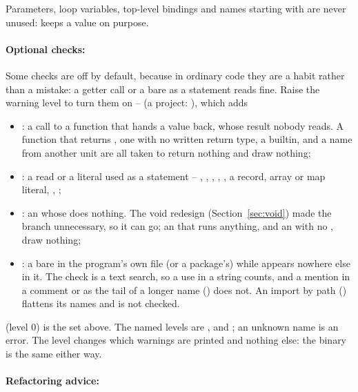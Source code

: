 \noindent Parameters, loop variables, top-level bindings and names
starting with \ic{\_} are never unused:  keeps a
value on purpose.

\paragraph{Optional checks: }
\label{sec:wlevel}

Some checks are off by default, because in ordinary code they are a
habit rather than a mistake: a getter call or a bare  as a
statement reads fine. Raise the warning level to turn them on --  (a project: ), which adds

\begin{itemize}[nosep]
\item {}: a call to a function that
  hands a value back, whose result nobody reads. A function that returns
  , one with no written return type, a builtin, and a name from
  another unit are all taken to return nothing and draw nothing;
\item {}: a read or a literal used
  as a statement -- , , , ,
  , a record, array or map literal, \ic{[x; n]}, ;
\item {}: an  whose  does
  nothing. The void redesign (Section~\ref{sec:void}) made the branch
  unnecessary, so it can go; an  that runs anything, and an
   with no , draw nothing;
\item {}: a bare  in the program's own
  file (or a package's) while  appears nowhere else in it. The
  check is a text search, so a use in a string counts, and a mention in a
  \ic{//} comment or as the tail of a longer name () does not.
  An import by path () flattens its names and is not
  checked.
\end{itemize}

\noindent {} (level 0) is the set above. The named
levels are ,  and ; an unknown name is an error. The
level changes which warnings are printed and nothing else: the binary is the
same either way.

\paragraph{Refactoring advice: }


